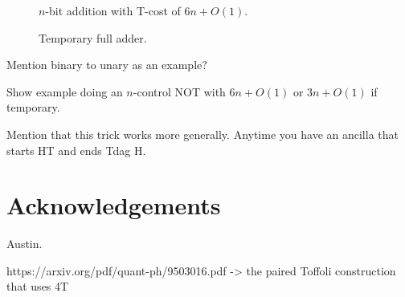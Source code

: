 \documentclass[twocolumn,longbibliography]{quantumarticle-customized}
\begin{document}
\begin{figure}
  \centering
  \makebox[\linewidth]{
  }
  \caption{
	$n$-bit addition with T-cost of $6n + O(1)$.
  }
  \label{fig:ancilla-addition}
\end{figure}

\begin{figure}
  \caption{
	Temporary full adder.
  }
  \label{fig:temporary-ancilla-addition}
\end{figure}

Mention binary to unary as an example?


Show example doing an $n$-control NOT with $6n + O(1)$ or $3n + O(1)$ if temporary.

Mention that this trick works more generally. Anytime you have an ancilla that starts HT and ends Tdag H.


\section{Acknowledgements}

Austin.





\cite{barenco1995}
https://arxiv.org/pdf/quant-ph/9503016.pdf   ->   the paired Toffoli construction that uses 4T
\end{document}
